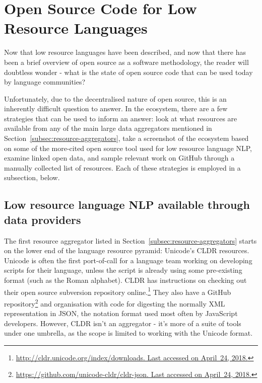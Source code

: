 \section{Open Source Code for Low Resource Languages}
\label{sec:endlangcode}

Now that low resource languages have been described, and now that there has been a brief overview of open source as a software methodology, the reader will doubtless wonder - what is the state of open source code that can be used today by language communities?


Unfortunately, due to the decentralised nature of open source, this is an inherently difficult question to answer. In the ecosystem, there are a few strategies that can be used to inform an answer: look at what resources are available from any of the main large data aggregators mentioned in Section~\ref{subsec:resource-aggregators}, take a screenshot of the ecosystem based on some of the more-cited open source tool used for low resource language NLP, examine linked open data, and sample relevant work on GitHub through a manually collected list of resources. Each of these strategies is employed in a subsection, below.

\subsection{Low resource language NLP available through data providers}
\label{subsec:lrl-nlp-through-providers}

The first resource aggregator listed in Section~\ref{subsec:resource-aggregators} starts on the lower end of the language resource pyramid: Unicode's CLDR resources. Unicode is often the first port-of-call for a language team working on developing scripts for their language, unless the script is already using some pre-existing format (such as the Roman alphabet). CLDR has instructions on checking out their open source subversion repository online.\footnote{\href{http://cldr.unicode.org/index/downloads}{http://cldr.unicode.org/index/downloads. Last accessed on April~24, 2018.}} They also have a GitHub repository\footnote{\href{https://github.com/unicode-cldr/cldr-json}{https://github.com/unicode-cldr/cldr-json. Last accessed on April~24, 2018.}} and organisation with code for digesting the normally XML representation in JSON, the notation format used most often by JavaScript developers. However, CLDR isn't an aggregator - it's more of a suite of tools under one umbrella, as the scope is limited to working with the Unicode format.

